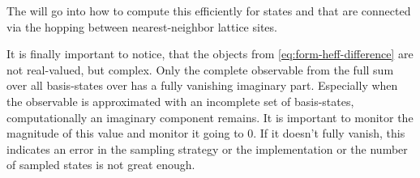 The  will go into how to compute this efficiently for states \ketN[N] and  that are connected via the hopping between nearest-neighbor lattice sites.

It is finally important to notice, that the objects from \autoref{eq:form-heff-difference} are not real-valued, but complex.
Only the complete observable from the full sum over all basis-states \ketN over  has a fully vanishing imaginary part. 
Especially when the observable is approximated with an incomplete set of basis-states, computationally an imaginary component remains. 
It is important to monitor the magnitude of this value and monitor it going to $0$.
If it doesn't fully vanish, this indicates an error in the sampling strategy or the implementation or the number of sampled states is not great enough.
